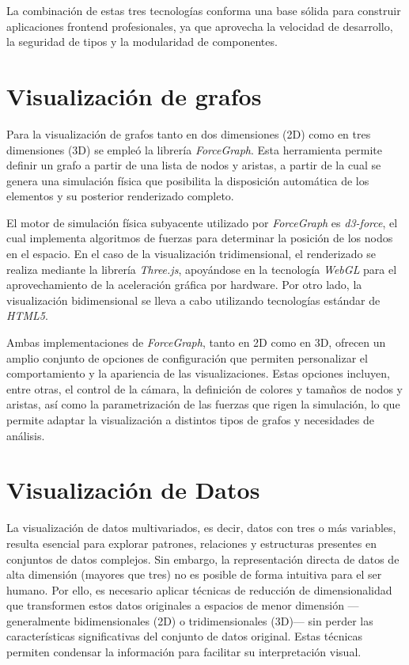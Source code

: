 \documentclass{article}
\begin{document}
La combinación de estas tres tecnologías conforma una base sólida para construir aplicaciones frontend profesionales, ya que aprovecha la velocidad de desarrollo, la seguridad de tipos y la modularidad de componentes.



\section{Visualización de grafos}
Para la visualización de grafos tanto en dos dimensiones (2D) como en tres dimensiones (3D) se empleó la librería \textit{ForceGraph}. Esta herramienta permite definir un grafo a partir de una lista de nodos y aristas, a partir de la cual se genera una simulación física que posibilita la disposición automática de los elementos y su posterior renderizado completo.

El motor de simulación física subyacente utilizado por \textit{ForceGraph} es \textit{d3-force}, el cual implementa algoritmos de fuerzas para determinar la posición de los nodos en el espacio. En el caso de la visualización tridimensional, el renderizado se realiza mediante la librería \textit{Three.js}, apoyándose en la tecnología \textit{WebGL} para el aprovechamiento de la aceleración gráfica por hardware. Por otro lado, la visualización bidimensional se lleva a cabo utilizando tecnologías estándar de \textit{HTML5}.

Ambas implementaciones de \textit{ForceGraph}, tanto en 2D como en 3D, ofrecen un amplio conjunto de opciones de configuración que permiten personalizar el comportamiento y la apariencia de las visualizaciones. Estas opciones incluyen, entre otras, el control de la cámara, la definición de colores y tamaños de nodos y aristas, así como la parametrización de las fuerzas que rigen la simulación, lo que permite adaptar la visualización a distintos tipos de grafos y necesidades de análisis.

\section{Visualización de Datos}

La visualización de datos multivariados, es decir, datos con tres o más variables, resulta esencial para explorar patrones, relaciones y estructuras presentes en conjuntos de datos complejos. Sin embargo, la representación directa de datos de alta dimensión (mayores que tres) no es posible de forma intuitiva para el ser humano. Por ello, es necesario aplicar técnicas de reducción de dimensionalidad que transformen estos datos originales a espacios de menor dimensión —generalmente bidimensionales (2D) o tridimensionales (3D)— sin perder las características significativas del conjunto de datos original. Estas técnicas permiten condensar la información para facilitar su interpretación visual.
\end{document}
